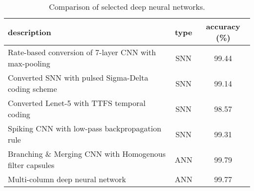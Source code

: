 \begin{table}[htbp]
    \centering
    \begin{tabularx}{\linewidth}{>{\raggedright\arraybackslash}Xcc}
    \toprule
        description & type & accuracy (\%) \\
        \midrule
        Rate-based conversion of 7-layer CNN with max-pooling \cite{rueckauerConversionContinuousValuedDeep2017} & SNN & 99.44 \\
        Converted SNN with pulsed Sigma-Delta coding scheme \cite{zambranoFastEfficientAsynchronous2016} & SNN & 99.14 \\
        Converted Lenet-5 with TTFS temporal coding \cite{rueckauerConversionAnalogSpiking2018} & SNN & 98.57 \\
        Spiking CNN with low-pass backpropagation rule \cite{leeTrainingDeepSpiking2016} & SNN & 99.31 \\
        Branching \& Merging CNN with Homogenous filter capsules \cite{kalganovaBranchingMerging20} & ANN & 99.79 \\
        Multi-column deep neural network \cite{cireganMulticolumnDeep12} & ANN & 99.77 \\
        \bottomrule
    \end{tabularx}
    \caption{Comparison of selected deep neural networks.}
    \label{tab:MNIST_benchmark}
\end{table}